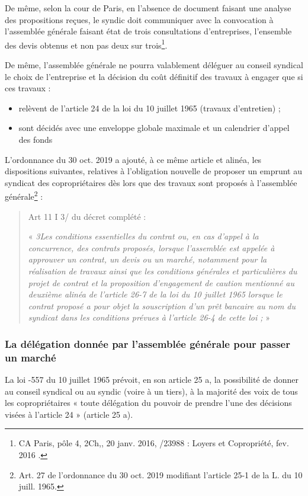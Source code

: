 			De même, selon la cour de Paris, en l’absence de document faisant une analyse des propositions reçues, le syndic doit communiquer avec la convocation à l’assemblée générale faisant état de trois consultations d’entreprises, l’ensemble des devis obtenus et non pas deux sur trois\footnote{CA Paris, pôle 4, 2\degres Ch,, 20 janv. 2016, /23988 : Loyers et Copropriété, fev. 2016 .}.
			
			De même, l’assemblée générale ne pourra valablement déléguer au conseil syndical le choix de l’entreprise et la décision du coût définitif des travaux à engager que si ces travaux :
			\begin{itemize}
				\item relèvent de l’article 24 de la loi du 10 juillet 1965 (travaux d’entretien) ;
				\item sont décidés avec une enveloppe globale maximale et un calendrier d’appel des fonds
			\end{itemize}
			
			L’ordonnance du 30 oct. 2019 a ajouté, à ce même article et alinéa, les dispositions suivantes, relatives à l’obligation nouvelle de proposer un emprunt au syndicat des copropriétaires dès lors que des travaux sont proposés à l’assemblée générale\footnote{Art. 27 de l’ordonnance du 30 oct. 2019 modifiant l’article 25-1 de la L. du 10 juill. 1965.} :
			\begin{quote}
				Art 11 I 3\degres/ du décret complété :
				
				« {\itshape 3\degres Les conditions essentielles du contrat ou, en cas d'appel à la concurrence, des contrats proposés, lorsque l'assemblée est appelée à approuver un contrat, un devis ou un marché, notamment pour la réalisation de travaux ainsi que les conditions générales et particulières du projet de contrat et la proposition d'engagement de caution mentionné au deuxième alinéa de l'article 26-7 de la loi du 10 juillet 1965 lorsque le contrat proposé a pour objet la souscription d'un prêt bancaire au nom du syndicat dans les conditions prévues à l'article 26-4 de cette loi ;} »
			\end{quote}
		
		\subsubsection{La délégation donnée par l’assemblée générale pour passer un marché}
		
			La loi -557 du 10 juillet 1965 prévoit, en son article 25 a, la possibilité de donner au conseil syndical ou au syndic (voire à un tiers), à la majorité des voix de tous les copropriétaires « toute délégation du pouvoir de prendre l'une des décisions visées à l'article 24 » (article 25 a).
			
